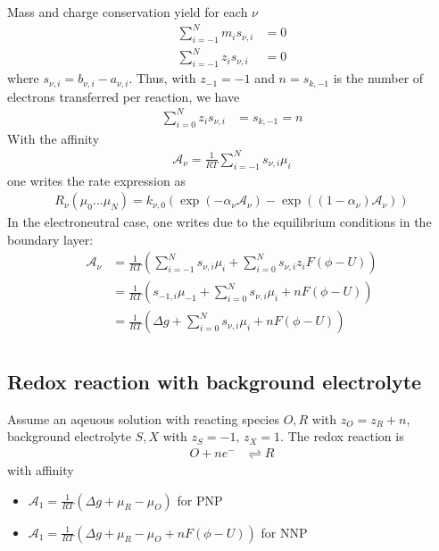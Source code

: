 \documentclass[12pt,oneside,reqno]{amsart}
\numberwithin{equation}{section}
\begin{document}
Mass and charge conservation yield for each $\nu$
\begin{align}
  \sum_{i=-1}^N m_i s_{\nu,i}&=0\\
  \sum_{i=-1}^N z_i s_{\nu,i}&=0
\end{align}
where $s_{\nu,i}=b_{\nu,i}-a_{\nu,i}$.
Thus, with $z_{-1}=-1$ and $n=s_{k,-1}$ is the number of electrons
transferred per reaction, we have
\begin{align}
  \sum_{i=0}^N z_i s_{\nu,i}&=s_{k,-1}=n
\end{align}
With the affinity
\begin{align}
  \mathcal A_\nu = \frac{1}{RT}\sum_{i=-1}^Ns_{\nu,i}\mu_i
\end{align}
one writes the rate expression as
\begin{align}
  R_\nu(\mu_0\dots\mu_N)= k_{\nu,0}\left(\exp(-\alpha_\nu\mathcal A_\nu) - \exp((1-\alpha_\nu)\mathcal A_\nu)\right)
\end{align}
In the electroneutral case, one writes due to the equilibrium conditions in the boundary layer:
\begin{align}
  \mathcal A_\nu &= \frac{1}{RT}\left(\sum_{i=-1}^Ns_{\nu,i}\mu_i + \sum_{i=0}^Ns_{\nu,i}z_iF(\phi -U)\right)\\
               &= \frac{1}{RT}\left(s_{-1,i}\mu_{-1}+ \sum_{i=0}^Ns_{\nu,i}\mu_i + nF(\phi -U)\right)\\
               &= \frac{1}{RT}\left(\Delta g+ \sum_{i=0}^Ns_{\nu,i}\mu_i + nF(\phi -U)\right)\\
\end{align}


\subsection{Redox reaction with background electrolyte}
Assume an aqeuous solution with reacting species
$O, R$  with $z_O= z_R+n$,  background electrolyte  $S, X$ with   $z_S=-1$, $z_X=1$.
The redox reaction is
\begin{align}\label{eq:redox}
     O + ne^- &\rightleftharpoons R
\end{align}
with affinity
\begin{itemize}
\item $\mathcal A_1= \frac{1}{RT}\left(\Delta g+ \mu_R - \mu_O\right)$ for PNP
\item $\mathcal A_1= \frac{1}{RT}\left(\Delta g+ \mu_R - \mu_O+ nF(\phi -U)\right)$ for NNP
\end{itemize}
\end{document}
